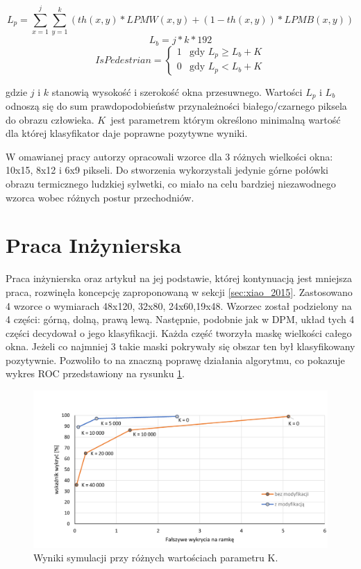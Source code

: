 \begin{equation}\label{equ:Lp}
L_{p} = \sum_{x=1}^{j}\sum_{y=1}^{k}(th(x,y)*LPMW(x,y)+(1-th(x,y))*LPMB(x,y))
\end{equation}
\begin{equation}\label{equ:Lb}
L_{b} = j*k*192
\end{equation}
\begin{equation} \label{equ:ispedistant}
IsPedestrian = \left\{ \begin{array}{ll}
1 & \textrm{gdy $L_{p} \geq L_{b} + K$}\\
0 & \textrm{gdy $L_{p}<L_{b} + K$}
\end{array} \right.
\end{equation}

\noindent gdzie $j$ i $k$ stanowią wysokość i szerokość okna przesuwnego. Wartości $L_p$ i $L_b$ odnoszą się do sum prawdopodobieństw przynależności białego/czarnego piksela do obrazu człowieka. $K$~jest parametrem którym określono minimalną wartość dla której klasyfikator daje poprawne pozytywne wyniki.

W omawianej pracy autorzy opracowali wzorce dla 3 różnych wielkości okna: 10x15, 8x12 i 6x9 pikseli. Do stworzenia wykorzystali jedynie górne połówki obrazu termicznego ludzkiej sylwetki, co miało na celu bardziej niezawodnego wzorca wobec różnych postur przechodniów.
\section{Praca Inżynierska}
Praca inżynierska \cite{kankaing} oraz artykuł na jej podstawie\cite{kanka2016fpga}, której kontynuacją jest mniejsza praca, rozwinęła koncepcję zaproponowaną w sekcji \ref{sec:xiao_2015}. Zastosowano 4 wzorce o wymiarach 48x120, 32x80, 24x60,19x48. Wzorzec został podzielony na 4 części: górną, dolną, prawą lewą. Następnie, podobnie jak w DPM, układ tych 4 części decydował o jego klasyfikacji. Każda część tworzyła maskę wielkości całego okna. Jeżeli co najmniej 3 takie maski pokrywały się obszar ten był klasyfikowany pozytywnie. Pozwoliło to na znaczną poprawę działania algorytmu, co pokazuje wykres ROC przedstawiony na rysunku \ref{fig:analiza_wykres}.

\begin{figure}
\centering
\includegraphics[width=0.8\linewidth]{images/Analiza_wykres}
\caption[Wykres REC]{Wyniki symulacji przy różnych wartościach parametru K.\cite{kankaing}}
\label{fig:analiza_wykres}
\end{figure}

